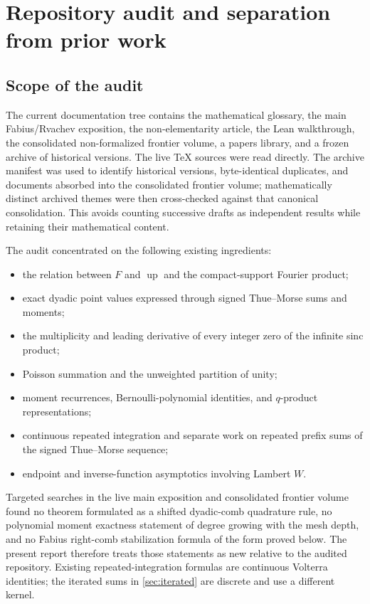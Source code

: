 \documentclass[11pt]{article}
\theoremstyle{definition}
\newcommand{\Up}{\operatorname{up}}
\begin{document}
\section{Repository audit and separation from prior work}
\label{sec:audit}

\subsection{Scope of the audit}

The current documentation tree contains the mathematical glossary, the main
Fabius/Rvachev exposition, the non-elementarity article, the Lean
walkthrough, the consolidated non-formalized frontier volume, a papers
library, and a frozen archive of historical versions.  The live TeX sources
were read directly.  The archive manifest was used to identify historical
versions, byte-identical duplicates, and documents absorbed into the
consolidated frontier volume; mathematically distinct archived themes were
then cross-checked against that canonical consolidation.  This avoids
counting successive drafts as independent results while retaining their
mathematical content.

The audit concentrated on the following existing ingredients:
\begin{itemize}[leftmargin=2em]
\item the relation between $F$ and $\Up$ and the compact-support Fourier
product;
\item exact dyadic point values expressed through signed Thue--Morse sums and
moments;
\item the multiplicity and leading derivative of every integer zero of the
infinite sinc product;
\item Poisson summation and the unweighted partition of unity;
\item moment recurrences, Bernoulli-polynomial identities, and $q$-product
representations;
\item continuous repeated integration and separate work on repeated prefix
sums of the signed Thue--Morse sequence;
\item endpoint and inverse-function asymptotics involving Lambert $W$.
\end{itemize}

Targeted searches in the live main exposition and consolidated frontier
volume found no theorem formulated as a shifted dyadic-comb quadrature rule,
no polynomial moment exactness statement of degree growing with the mesh
depth, and no Fabius right-comb stabilization formula of the form proved
below.  The present report therefore treats those statements as new relative
to the audited repository.  Existing repeated-integration formulas are
continuous Volterra identities; the iterated sums in \cref{sec:iterated} are
discrete and use a different kernel.
\end{document}
